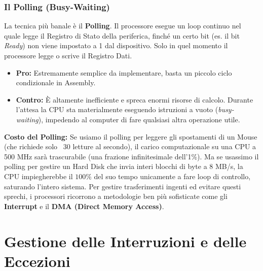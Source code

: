 \documentclass[12pt, a4paper]{article}
\begin{document}
\subsubsection{Il Polling (Busy-Waiting)}
La tecnica più banale è il \textbf{Polling}. Il processore esegue un loop continuo nel quale legge il Registro di Stato della periferica, finché un certo bit (es. il bit \textit{Ready}) non viene impostato a 1 dal dispositivo. Solo in quel momento il processore legge o scrive il Registro Dati.
\begin{itemize}
    \item \textbf{Pro:} Estremamente semplice da implementare, basta un piccolo ciclo condizionale in Assembly.
    \item \textbf{Contro:} È altamente inefficiente e spreca enormi risorse di calcolo. Durante l'attesa la CPU sta materialmente eseguendo istruzioni a vuoto (\textit{busy-waiting}), impedendo al computer di fare qualsiasi altra operazione utile.
\end{itemize}
\textbf{Costo del Polling:} Se usiamo il polling per leggere gli spostamenti di un Mouse (che richiede solo ~30 letture al secondo), il carico computazionale su una CPU a 500 MHz sarà trascurabile (una frazione infinitesimale dell'1\%). Ma se usassimo il polling per gestire un Hard Disk che invia interi blocchi di byte a $8$ MB/s, la CPU impiegherebbe il $100\%$ del suo tempo unicamente a fare loop di controllo, saturando l'intero sistema.
Per gestire trasferimenti ingenti ed evitare questi sprechi, i processori ricorrono a metodologie ben più sofisticate come gli \textbf{Interrupt} e il \textbf{DMA (Direct Memory Access)}.


\section{Gestione delle Interruzioni e delle Eccezioni}
\end{document}
